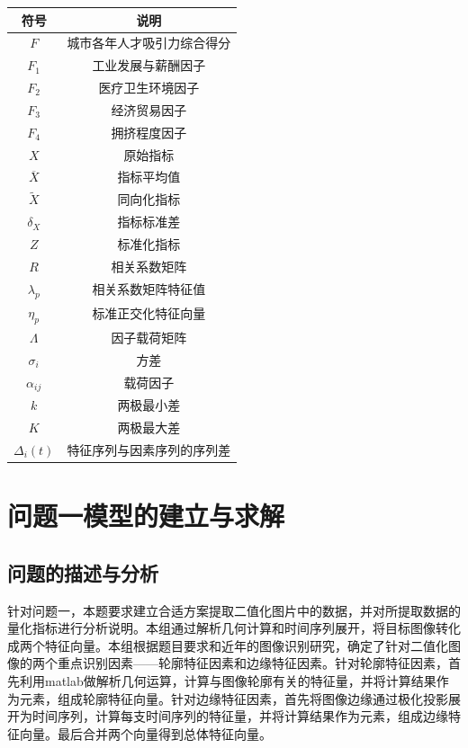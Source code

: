 \documentclass{whutmod}
\begin{document}
	\begin{table}[H]
	\label{biao} \centering
		\begin{tabular}{cc}
			\toprule[1.5pt]
			\multicolumn{1}{m{5cm}}{\centering 符号} & \multicolumn{1}{m{5cm}}{\centering 说明} \\
			\midrule[1pt]
			$F$	 &  城市各年人才吸引力综合得分  \\ 
			$F_{1}$ &  工业发展与薪酬因子 \\ 
			$F_{2}$	 &  医疗卫生环境因子 \\ 
			$F_{3}$  &  经济贸易因子 \\ 
			$F_{4}$  &  拥挤程度因子 \\ 
			$X$  &  原始指标 \\ 
			$\overline{X}$  &  指标平均值 \\ 
			$\widetilde{X}$  &  同向化指标 \\ 
	     	$\delta_{X}$  &  指标标准差 \\ 
	     	$Z$  & 标准化指标 \\ 
	     	$R$  & 相关系数矩阵 \\ 
	     	$\lambda_{p}$  & 相关系数矩阵特征值 \\ 
	     	$\eta _ {p}$  & 标准正交化特征向量 \\ 
	     	$\Lambda$ & 因子载荷矩阵 \\ 
	     	$\sigma_{i}$ & 方差 \\
	     	$\alpha_{i j}$ & 载荷因子 \\
	     	$k$ & 两极最小差 \\
	     	$K$ & 两极最大差 \\
	     	$\Delta _{i}(t)$ & 特征序列与因素序列的序列差 \\
			\bottomrule[1.5pt]
		\end{tabular}
	\end{table}

	\section{问题一模型的建立与求解}
	\subsection{问题的描述与分析}

	针对问题一，本题要求建立合适方案提取二值化图片中的数据，并对所提取数据的量化指标进行分析说明。本组通过解析几何计算和时间序列展开，将目标图像转化成两个特征向量。本组根据题目要求和近年的图像识别研究，确定了针对二值化图像的两个重点识别因素——轮廓特征因素和边缘特征因素。针对轮廓特征因素，首先利用matlab做解析几何运算，计算与图像轮廓有关的特征量，并将计算结果作为元素，组成轮廓特征向量。针对边缘特征因素，首先将图像边缘通过极化投影展开为时间序列，计算每支时间序列的特征量，并将计算结果作为元素，组成边缘特征向量。最后合并两个向量得到总体特征向量。
\end{document}

